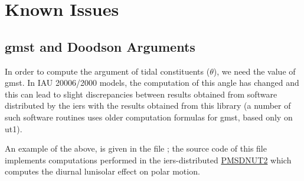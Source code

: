 \section{Known Issues}\label{sec:known-issues}

\subsection{\gls{gmst} and Doodson Arguments}\label{ssec:gmst-and-soodson-arguemnts}

In order to compute the argument of tidal constituents ($\theta$), we need the 
value of \gls{gmst}. In IAU 20006/2000 models, the computation of this angle 
has changed and this can lead to slight discrepancies between results obtained 
from software distributed by the \gls{iers} with the results obtained from this 
library (a number of such software routines uses older computation formulas for 
\gls{gmst}, based only on \gls{ut1}).

An example of the above, is given in the file ; 
the source code of this file implements computations performed in the 
\gls{iers}-distributed \href{https://iers-conventions.obspm.fr/content/chapter5/software/PMSDNUT2.F}{PMSDNUT2} 
which computes the diurnal lunisolar effect on polar motion.
